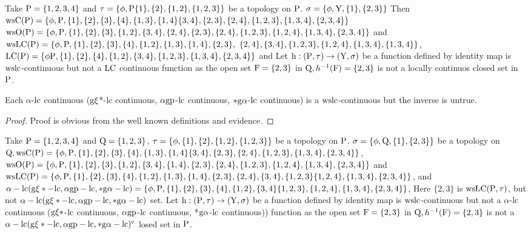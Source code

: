\begin{exm}\label{exam7.3.2}
Take $\mathrm{P} = \{1, 2, 3, 4\}$ and $\tau = \{\phi, \mathrm{P} \{1\}, \{2\}, \{1, 2\}, \{1, 2, 3\}\}$ be a topology on $\mathrm{P}$. $\sigma = \{\phi, \mathrm{Y}, \{1\},\{ 2, 3\}\}$ Then $\ws\TSC(\TSP) = \{\phi, \TSP,\{1\}, \{2\}, \{3\}, \{4\}, \{1,3\},\break \{1, 4\} \{3,4\},\{2,3\}, \{2,4\}, \{1,2, 3\},\{1,3,4\},\{2,3,4\}\}$ $\ws\TSO(\TSP) = \{\phi, \TSP, \{1\}, \{2\}, \{3\},\break \{1,2\}, \{3,4\}, \{2,4\},\{2,3\}, \{2,4\}, \{1,2,3\}, \{1,2,4\},\{1,3,4\},\{2,3,4\}\}$ and $\ws\LC(\TSP)= \{\phi,\TSP ,\{1\}, \{2\},\{3\},\{4\},\{1,2\},\{1,3\}, \{1,4\}, \{2,3\},~ \{2,4\},\{3,4\}, \{1,2,3\},\{1,2,4\},\break \{1,3,4\},\{1,3,4\}\}$, $\LC(\TSP)=\{ \phi \TSP,\{1\}, \{2\}, \{4\}, \{1, 2\}, \{3,4\}, \{1,2,3\},\{1,3,4\},\break \{2,3,4\}\}$ and Let $\mathrm{h}: (\mathrm{P}, \tau )\to(\mathrm{Y}, \sigma)$ be a function defined by identity map is $\mathrm{ws}\mathrm{lc}$-continuous but not a $\mathrm{LC}$ continuous function as the open set $\mathrm{F}=\{2,3\}$ in $\mathrm{Q}, h^{-1} (\mathrm{F})=\{2,3\}$ is not a locally continuos closed set in $\mathrm{P}$.
\end{exm}

\begin{thm}\label{thm7.3.2}
Each $\alpha$-$\mathrm{lc}$ continuous ($\mathrm{g}\xi$*-lc continuous, $\alpha\mathrm{gp}$-$\mathrm{lc}$ continuous, $*\mathrm{g}\alpha$-$\mathrm{lc}$ continuous) is a $\mathrm{ws}\mathrm{lc}$-continuous but the inverse is untrue.
\end{thm}

\begin{proof}
Proof is obvious from the well known definitions and evidence.
\end{proof}

\begin{exm}\label{exam7.3.3}
Take $\mathrm{P} = \{1, 2, 3, 4\}$ and $\mathrm{Q} = \{1, 2, 3\}$, $\tau = \{\phi, \{1\}, \{2\}, \{1, 2\},\break \{1, 2, 3\}\}$ be a topology on $\mathrm{P}$. $\sigma = \{\phi, \mathrm{Q}, \{1\},\{ 2, 3\}\}$ be a topology on $\mathrm{Q}, \mathrm{ws}\mathrm{C}(\mathrm{P}) = \{\phi, \mathrm{P},\{1\}, \{2\}, \{3\}, \{4\}, \{1,3\}, \{1, 4\} \{3,4\}, \{2,3\}, \{2,4\}, \{1,2, 3\},\{1,3,4\},\{2,3,4\}\}$,\break $\ws\TSO(\TSP) = \{\phi, \TSP, \{1\}, \{2\},\{3\},\{1,2\}, \{3,4\}, \{1,4\}, \{2,3\}, \{2,4\}, \{1,2,3\}, \{1,2,4\},\break \{1,3,4\},\{2,3,4\}\}$ and $\ws\LC(\TSP)= \{\phi, \TSP,\{1\}, \{2\}, \{3\},\{4\},\{1,2\},\{1,3\}, \{1,4\},\break \{2,3\}, \{2,4\},\{3,4\}, \{1,2,3\}\{1,2,4\},\{1,3,4\},\{2,3,4\}\}$, and $\alpha - \lc(\TSg\xi* -\lc, \alpha \gp-\lc, *\TSg\alpha-\lc) = \{ \phi, \TSP, \{1\}, \{2\}, \{3\}, \{4\}, \{1,2\}, \{3, 4\} \{1,2,3\},\{1,2,4\},\{1,3,4\},\break \{2,3,4\}\}$, Here $\{2,3\}$ is $\mathrm{ws}\mathrm{LC} (\mathrm{P}, \tau)$, but not $\alpha - \mathrm{lc}(\mathrm{g}\xi* -\mathrm{lc}, \alpha\mathrm{gp}-\mathrm{lc}, *\mathrm{g}\alpha-\mathrm{lc})$ set. Let $\mathrm{h}: (\mathrm{P}, \tau )\to(\mathrm{Y}, \sigma)$ be a function defined by identity map is $\mathrm{ws}\mathrm{lc}$-continuous but not a $\alpha$-$\mathrm{lc}$ continuous ($\mathrm{g}\xi*$-$\mathrm{lc}$ continuous, $\alpha\mathrm{gp}$-$\mathrm{lc}$ continuous, *$\mathrm{g}\alpha$-$\mathrm{lc}$ continuous)) function as the open set $\mathrm{F}=\{2,3\}$ in $\mathrm{Q}, h^{-1} (\mathrm{F})=\{2,3\}$ is not a $\alpha - \mathrm{lc}(\mathrm{g}\xi * -\mathrm{lc}, \alpha\mathrm{gp}-\mathrm{lc}, *\mathrm{g}\alpha-\mathrm{lc})^{\text{c}}$ losed set in $\mathrm{P}$.
\end{exm}

